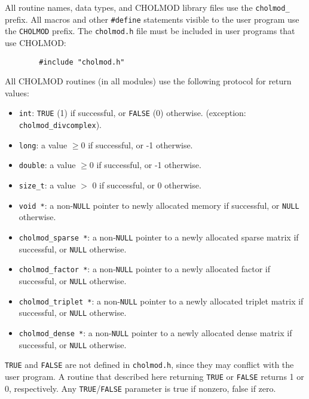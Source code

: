 \documentclass[11pt]{article}
\begin{document}
All routine names, data types, and CHOLMOD library files use the
{\tt cholmod\_} prefix.  All macros and other {\tt \#define} statements
visible to the user program use the {\tt CHOLMOD} prefix.
The {\tt cholmod.h} file must be included in user programs that use CHOLMOD:

{\footnotesize
\begin{verbatim}
        #include "cholmod.h"
\end{verbatim}
}

\noindent
All CHOLMOD routines (in all modules) use the following protocol for return values:
\begin{itemize}
\item {\tt int}: {\tt TRUE} (1) if successful, or {\tt FALSE} (0) otherwise. (exception: {\tt cholmod\_divcomplex}).
\item {\tt long}: a value $\ge 0$ if successful, or -1 otherwise.
\item {\tt double}: a value $\ge 0$ if successful, or -1 otherwise.
\item {\tt size\_t}: a value $>$ 0 if successful, or 0 otherwise.
\item {\tt void *}: a non-{\tt NULL} pointer to newly allocated memory if successful, or {\tt NULL} otherwise.
\item {\tt cholmod\_sparse *}:  a non-{\tt NULL} pointer to a newly allocated sparse matrix if successful, or {\tt NULL} otherwise.
\item {\tt cholmod\_factor *}:  a non-{\tt NULL} pointer to a newly allocated factor if successful, or {\tt NULL} otherwise.
\item {\tt cholmod\_triplet *}: a non-{\tt NULL} pointer to a newly allocated triplet matrix if successful, or {\tt NULL} otherwise.
\item {\tt cholmod\_dense *}:   a non-{\tt NULL} pointer to a newly allocated dense matrix if successful, or {\tt NULL} otherwise.
\end{itemize}

{\tt TRUE} and {\tt FALSE} are not defined in {\tt cholmod.h},
since they may conflict with the user program.  A routine that described
here returning {\tt TRUE} or {\tt FALSE} returns 1 or 0, respectively.
Any {\tt TRUE}/{\tt FALSE} parameter is true if nonzero, false if zero.
\end{document}
